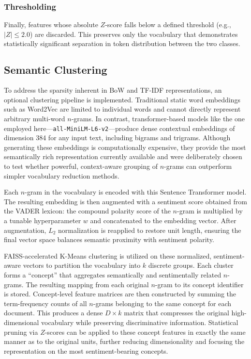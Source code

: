 \documentclass[a4paper,twoside,12pt]{book}
\newcommand{\zscore}{Z}
\newcommand{\kconcepts}{k}
\newcommand{\weightparam}{w}
\begin{document}
\subsubsection{Thresholding}
Finally, features whose absolute $\zscore$-score falls below a defined threshold (e.g., $|\zscore| \le 2.0$) are discarded. This preserves only the vocabulary that demonstrates statistically significant separation in token distribution between the two classes.

\subsection{Semantic Clustering} \label{sec:semantic_clustering}

To address the sparsity inherent in BoW and TF-IDF representations, an optional clustering pipeline is implemented. Traditional static word embeddings such as Word2Vec are limited to individual words and cannot directly represent arbitrary multi-word $n$-grams. In contrast, transformer-based models like the one employed here---\texttt{all-MiniLM-L6-v2}---produce dense contextual embeddings of dimension 384 for any input text, including bigrams and trigrams. Although generating these embeddings is computationally expensive, they provide the most semantically rich representation currently available and were deliberately chosen to test whether powerful, context-aware grouping of $n$-grams can outperform simpler vocabulary reduction methods.

Each $n$-gram in the vocabulary is encoded with this Sentence Transformer model. The resulting embedding is then augmented with a sentiment score obtained from the VADER lexicon: the compound polarity score of the $n$-gram is multiplied by a tunable hyperparameter $\weightparam$ and concatenated to the embedding vector. After augmentation, $L_2$ normalization is reapplied to restore unit length, ensuring the final vector space balances semantic proximity with sentiment polarity.

FAISS-accelerated K-Means clustering is utilized on these normalized, sentiment-aware vectors to partition the vocabulary into $\kconcepts$ discrete groups. Each cluster forms a ``concept'' that aggregates semantically and sentimentally related $n$-grams. The resulting mapping from each original $n$-gram to its concept identifier is stored. Concept-level feature matrices are then constructed by summing the term-frequency counts of all $n$-grams belonging to the same concept for each document. This produces a dense $D \times \kconcepts$ matrix that compresses the original high-dimensional vocabulary while preserving discriminative information. Statistical pruning via $\zscore$-scores can be applied to these concept features in exactly the same manner as to the original units, further reducing dimensionality and focusing the representation on the most sentiment-bearing concepts.
\end{document}
